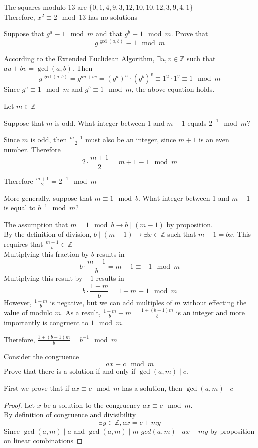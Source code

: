 \documentclass[12pt]{article}
\begin{document}
\solution
The squares modulo 13 are $\{0,1,4,9,3,12,10,10,12,3,9,4,1\}$\\
Therefore, $x^2\equiv 2\mod 13$ has no solutions

\problem Suppose that $g^a\equiv 1\mod m$ and that $g^b\equiv 1\mod m$. Prove that
\[g^{\gcd(a,b)}\equiv 1\mod m\]

\solution
According to the Extended Euclidean Algorithm, $\exists u,v\in\mathbb{Z}$ such that $au+bv=\gcd(a,b)$. Then
\[g^{\gcd(a,b)}=g^{au+bv}=(g^a)^u\cdot(g^b)^v\equiv1^u\cdot1^v\equiv 1\mod{m}\]
Since $g^a\equiv1\mod{m}$ and $g^b\equiv1\mod{m}$, the above equation holds.

\newpage
\problem Let $m\in\mathbb{Z}$

\subproblem Suppose that $m$ is odd. What integer between 1 and $m-1$ equals $2^{-1}\mod{m}$?

\solution
Since $m$ is odd, then $\frac{m+1}{2}$ must also be an integer, since $m+1$ is an even number. Therefore
\[2\cdot\frac{m+1}{2}=m+1\equiv1\mod{m}\]

\noindent
Therefore $\frac{m+1}{2}=2^{-1}\mod{m}$

\subproblem More generally, suppose that $m\equiv 1\mod b$. What integer between 1 and $m-1$ is equal to $b^{-1}\mod m$?

\solution
The assumption that $m=1\mod{b}\rightarrow b\mid (m-1)$ by proposition.\\
By the definition of division, $b\mid (m-1)\rightarrow\exists x\in\mathbb{Z}$ such that $m-1=bx$. This requires that $\frac{m-1}{b}\in\mathbb{Z}$\\
Multiplying this fraction by $b$ results in
\[b\cdot\frac{m-1}{b}=m-1\equiv-1\mod{m}\]
Multiplying this result by $-1$ results in
\[b\cdot\frac{1-m}{b}=1-m\equiv1\mod{m}\]
However, $\frac{1-m}{b}$ is negative, but we can add multiples of $m$ without effecting the value of modulo $m$. As a result, $\frac{1-m}{b}+m=\frac{1+(b-1)m}{b}$ is an integer and more importantly is congruent to $1\mod{m}$.

\noindent
Therefore, $\frac{1+(b-1)m}{b}=b^{-1}\mod{m}$

\newpage
\problem Consider the congruence
\[
    ax\equiv c\mod m
\]
Prove that there is a solution if and only if $\gcd(a,m)\mid c$.

\solution
First we prove that if $ax\equiv c\mod{m}$ has a solution, then $\gcd(a,m)\mid c$
\begin{proof}
    Let $x$ be a solution to the congruency $ax\equiv c\mod{m}$.\\
    By definition of congruence and divisibility
    \[\exists y\in\mathbb{Z},ax=c+my\]
    Since $\gcd(a,m)\mid a$ and $\gcd(a,m)\mid m$ $gcd(a,m)\mid ax-my$ by proposition on linear combinations
\end{proof}
\end{document}

